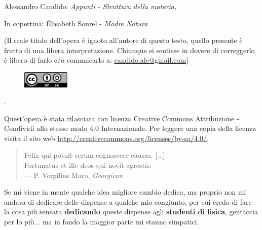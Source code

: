 \thispagestyle{empty}

\hfill

\vfill


\noindent Alessandro Candido: \textit{Appunti - Struttura della materia,}
\textcopyleft\ \DTMMonthname{\the\month} \the\year
\newline

\noindent In copertina: \'Elisabeth Sonrel - \textit{Madre Natura}

(Il reale titolo dell'opera è ignoto all'autore di questo testo, quello presente è frutto di una libera interpretazione. Chiunque si sentisse in dovere di correggerlo è libero di farlo e/o comunicarlo a: \href{mailto:candido.ale@gmail.com}{candido.ale@gmail.com})

\begin{figure}
	\centering
	\includegraphics[width=0.2\textwidth]{Licenza/by-sa.pdf}
\end{figure}
.
\newline

Quest'opera è stata rilasciata con licenza Creative Commons Attribuzione - Condividi allo stesso modo 4.0 Internazionale. Per leggere una copia della licenza visita il sito web \href{http://creativecommons.org/licenses/by-sa/4.0/}{http://creativecommons.org/licenses/by-sa/4.0/}.

\setcounter{tocdepth}{2}
\tableofcontents
\markboth{\scshape{\contentsname}}{\scshape{\contentsname}}

\clearpage
{}
\thispagestyle{empty}

\vspace*{3cm}

\begin{quote}
	Felix qui potuit rerum cognoscere causas, [...] \\
	Fortunatus et ille deos qui novit agrestis, \\ \medskip
	--- P. Vergilius Maro, \textit{Georgicon}
\end{quote}

\medskip

\begin{center}
	Se mi viene in mente qualche idea migliore cambio dedica, ma proprio non mi andava di dedicare delle dispense a qualche mio congiunto, per cui credo di fare la cosa più sensata \textbf{dedicando} queste dispense agli \textbf{studenti di fisica}, gentaccia per lo più... ma in fondo la maggior parte mi stanno simpatici.
\end{center}

